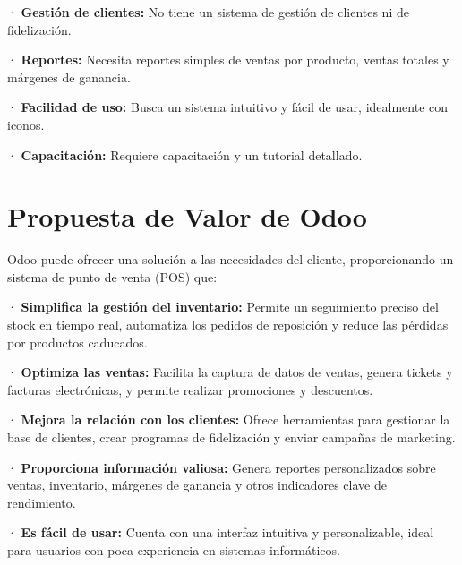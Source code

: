 \documentclass[12pt]{report}
\begin{document}
· \textbf{Gestión de clientes:} No tiene un sistema de gestión de clientes ni de fidelización.

· \textbf{Reportes:} Necesita reportes simples de ventas por producto, ventas totales y márgenes de ganancia.

· \textbf{Facilidad de uso:} Busca un sistema intuitivo y fácil de usar, idealmente con iconos.

· \textbf{Capacitación:} Requiere capacitación y un tutorial detallado.


\newpage
{}
\chapter{Propuesta de Valor de Odoo}

Odoo puede ofrecer una solución  a las necesidades del cliente, proporcionando un sistema de punto de venta (POS) que:

· \textbf{Simplifica la gestión del inventario:} Permite un seguimiento preciso del stock en tiempo real, automatiza los pedidos de reposición y reduce las pérdidas por productos caducados.

· \textbf{Optimiza las ventas:} Facilita la captura de datos de ventas, genera tickets y facturas electrónicas, y permite realizar promociones y descuentos.

· \textbf{Mejora la relación con los clientes:} Ofrece herramientas para gestionar la base de clientes, crear programas de fidelización y enviar campañas de marketing.

· \textbf{Proporciona información valiosa:} Genera reportes personalizados sobre ventas, inventario, márgenes de ganancia y otros indicadores clave de rendimiento.

· \textbf{Es fácil de usar:} Cuenta con una interfaz intuitiva y personalizable, ideal para usuarios con poca experiencia en sistemas informáticos.
\end{document}
